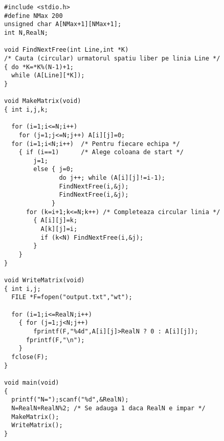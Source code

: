 \begin{verbatim}
#include <stdio.h>
#define NMax 200
unsigned char A[NMax+1][NMax+1];
int N,RealN;

void FindNextFree(int Line,int *K)
/* Cauta (circular) urmatorul spatiu liber pe linia Line */
{ do *K=*K%(N-1)+1;
  while (A[Line][*K]);
}

void MakeMatrix(void)
{ int i,j,k;

  for (i=1;i<=N;i++)
    for (j=1;j<=N;j++) A[i][j]=0;
  for (i=1;i<N;i++)  /* Pentru fiecare echipa */
    { if (i==1)      /* Alege coloana de start */
        j=1;
        else { j=0;
               do j++; while (A[i][j]!=i-1);
               FindNextFree(i,&j);
               FindNextFree(i,&j);
             }
      for (k=i+1;k<=N;k++) /* Completeaza circular linia */
        { A[i][j]=k;
          A[k][j]=i;
          if (k<N) FindNextFree(i,&j);
        }
    }
}

void WriteMatrix(void)
{ int i,j;
  FILE *F=fopen("output.txt","wt");

  for (i=1;i<=RealN;i++)
    { for (j=1;j<N;j++)
        fprintf(F,"%4d",A[i][j]>RealN ? 0 : A[i][j]);
      fprintf(F,"\n");
    }
  fclose(F);
}

void main(void)
{
  printf("N=");scanf("%d",&RealN);
  N=RealN+RealN%2; /* Se adauga 1 daca RealN e impar */
  MakeMatrix();
  WriteMatrix();
}
\end{verbatim}
